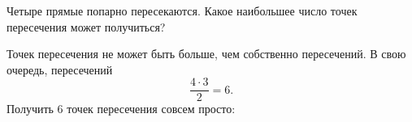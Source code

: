 
\begin{itemize}

	\itA Четыре прямые попарно пересекаются. Какое наибольшее число \linebreak точек пересечения может получиться?
	
	\itr Точек пересечения не может быть больше, чем собственно пересечений. В свою очередь, пересечений
	$$\frac{4 \cdot 3}{2} = 6.$$
	Получить 6 точек пересечения совсем просто:
	
	\begin{center}  \end{center}

\end{itemize}


